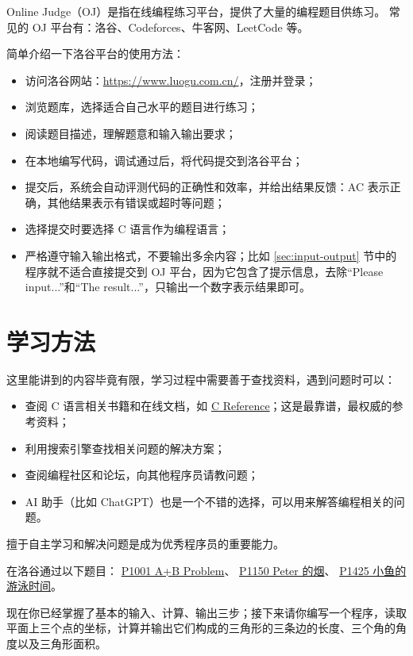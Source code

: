 \documentclass[lang=cn,newtx,10pt,scheme=chinese]{elegantbook}
\begin{document}
Online Judge（OJ）是指在线编程练习平台，提供了大量的编程题目供练习。
常见的 OJ 平台有：洛谷、Codeforces、牛客网、LeetCode 等。

简单介绍一下洛谷平台的使用方法：

\begin{itemize}
    \item 访问洛谷网站：\href{https://www.luogu.com.cn/}{https://www.luogu.com.cn/}，注册并登录；
    \item 浏览题库，选择适合自己水平的题目进行练习；
    \item 阅读题目描述，理解题意和输入输出要求；
    \item 在本地编写代码，调试通过后，将代码提交到洛谷平台；
    \item 提交后，系统会自动评测代码的正确性和效率，并给出结果反馈：AC 表示正确，其他结果表示有错误或超时等问题；
    \item 选择提交时要选择 C 语言作为编程语言；
    \item 严格遵守输入输出格式，不要输出多余内容；比如 \ref{sec:input-output} 节中的程序就不适合直接提交到 OJ 平台，因为它包含了提示信息，去除“Please input...”和“The result...”，只输出一个数字表示结果即可。
\end{itemize}

\section{学习方法}

这里能讲到的内容毕竟有限，学习过程中需要善于查找资料，遇到问题时可以：
\begin{itemize}
    \item 查阅 C 语言相关书籍和在线文档，如 \href{https://en.cppreference.com/w/c}{C Reference}；这是最靠谱，最权威的参考资料；
    \item 利用搜索引擎查找相关问题的解决方案；
    \item 查阅编程社区和论坛，向其他程序员请教问题；
    \item AI 助手（比如 ChatGPT）也是一个不错的选择，可以用来解答编程相关的问题。
\end{itemize}
擅于自主学习和解决问题是成为优秀程序员的重要能力。

\begin{problemset}[练习]
    \item 在洛谷通过以下题目：
        \href{https://www.luogu.com.cn/problem/P1001}{P1001 A+B Problem}、
        \href{https://www.luogu.com.cn/problem/P1150}{P1150 Peter 的烟}、
        \href{https://www.luogu.com.cn/problem/P1425}{P1425 小鱼的游泳时间}。
    \item 现在你已经掌握了基本的输入、计算、输出三步；接下来请你编写一个程序，读取平面上三个点的坐标，计算并输出它们构成的三角形的三条边的长度、三个角的角度以及三角形面积。
\end{problemset}
\end{document}
